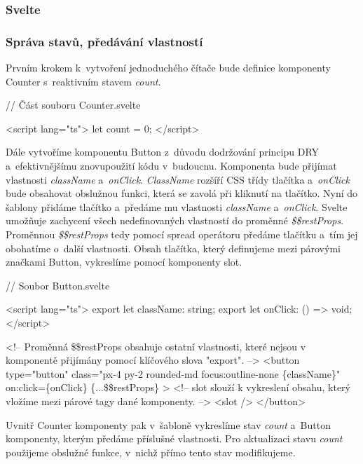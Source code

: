 \subsubsection{Svelte}

\subsubsection*{Správa stavů, předávání vlastností}

Prvním krokem k~vytvoření jednoduchého čítače bude definice komponenty Counter s~reaktivním stavem \emph{count}.

\begin{prog}
// Část souboru Counter.svelte

<script lang="ts">
  let count = 0;
</script>
\end{prog}

Dále vytvoříme komponentu Button z~důvodu dodržování principu DRY a~efektivnějšímu znovupoužití kódu v~budoucnu.
Komponenta bude přijímat vlastnosti \emph{className} a~\emph{onClick}. \emph{ClassName} rozšíří CSS třídy tlačítka a~\emph{onClick} bude obsahovat obslužnou funkci, která se zavolá při kliknutí na tlačítko.
Nyní do šablony přidáme tlačítko a~předáme mu vlastnosti \emph{className} a~\emph{onClick}.
Svelte umožňuje zachycení všech nedefinovaných vlastností do proměnné \emph{\$\$restProps}. Proměnnou \emph{\$\$restProps} tedy pomocí spread operátoru předáme tlačítku a~tím jej obohatíme o~další vlastnosti. 
Obsah tlačítka, který definujeme mezi párovými značkami Button, vykreslíme pomocí komponenty slot.

\newpage
\begin{prog}
// Soubor Button.svelte

<script lang="ts">
  export let className: string;
  export let onClick: () => void;
</script>

<!-- Proměnná \$\$restProps obsahuje ostatní vlastnosti, 
  které nejsou v komponentě přijímány pomocí klíčového slova "export". -->
<button
  type="button"
  class="px-4 py-2 rounded-md focus:outline-none \{className\}"
  on:click=\{onClick\}
  \{...\$\$restProps\}
>
  <!-- slot slouží k vykreslení obsahu, 
    který vložíme mezi párové tagy dané komponenty. -->
  <slot />
</button>
\end{prog}

Uvnitř Counter komponenty pak v~šabloně vykreslíme stav \emph{count} a~Button komponenty, kterým předáme příslušné vlastnosti. 
Pro aktualizaci stavu \emph{count} použijeme obslužné funkce, v~nichž přímo tento stav modifikujeme.

